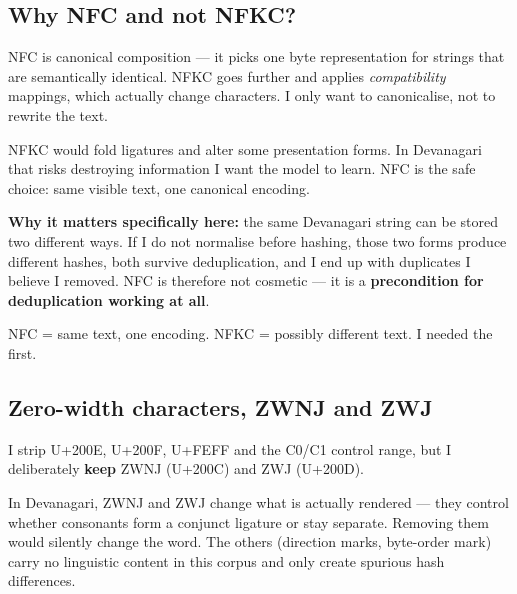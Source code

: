 \documentclass[11pt]{report}
\begin{document}
\subsection{Why NFC and not NFKC?}

\begin{shortans}
NFC is canonical composition --- it picks one byte representation for strings
that are semantically identical. NFKC goes further and applies
\emph{compatibility} mappings, which actually change characters. I only want to
canonicalise, not to rewrite the text.
\end{shortans}

\begin{deeper}
NFKC would fold ligatures and alter some presentation forms. In Devanagari that
risks destroying information I want the model to learn. NFC is the safe choice:
same visible text, one canonical encoding.

\medskip
\textbf{Why it matters specifically here:} the same Devanagari string can be
stored two different ways. If I do not normalise before hashing, those two
forms produce different hashes, both survive deduplication, and I end up with
duplicates I believe I removed. NFC is therefore not cosmetic --- it is a
\textbf{precondition for deduplication working at all}.
\end{deeper}

\begin{keypoint}
NFC = same text, one encoding. NFKC = possibly different text. I needed the
first.
\end{keypoint}

\subsection{Zero-width characters, ZWNJ and ZWJ}

\begin{shortans}
I strip U+200E, U+200F, U+FEFF and the C0/C1 control range, but I deliberately
\textbf{keep} ZWNJ (U+200C) and ZWJ (U+200D).
\end{shortans}

\begin{deeper}
In Devanagari, ZWNJ and ZWJ change what is actually rendered --- they control
whether consonants form a conjunct ligature or stay separate. Removing them
would silently change the word. The others (direction marks, byte-order mark)
carry no linguistic content in this corpus and only create spurious hash
differences.
\end{deeper}
\end{document}
